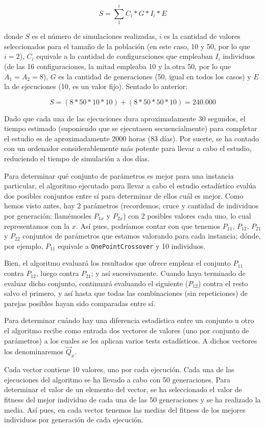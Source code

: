 $$
S = \sum_{1}^{i} C_i * G * I_i * E
$$

donde $S$ es el número de simulaciones realizadas, $i$ es la cantidad de valores seleccionados para el tamaño de la población (en este caso, 10 y 50, por lo que $i=2$), $C_i$ equivale a la cantidad de configuraciones que empleaban $I_i$ individuos (de las 16 configuraciones, la mitad empleaba 10 y la otra 50, por lo que $A_1 = A_2 = 8$), $G$ es la cantidad de generaciones (50, igual en todos los casos) y $E$ la de ejecuciones (10, es un valor fijo). Sentado lo anterior:

$$
S = (8*50*10*10) + (8*50*50*10) = 240.000
$$

Dado que cada una de las ejecuciones dura aproximadamente 30 segundos, el tiempo estimado (suponiendo que se ejecutasen secuencialmente) para completar el estudio es de aproximadamente 2000 horas (83 días). Por suerte, se ha contado con un ordenador considerablemente más potente para llevar a cabo el estudio, reduciendo el tiempo de simulación a dos días.

Para determinar qué conjunto de parámetros es mejor para una instancia particular, el algoritmo ejecutado para llevar a cabo el estudio estadístico evalúa dos posibles conjuntos entre sí para determinar de ellos cuál es mejor. Como hemos visto antes, hay 2 parámetros (recordemos, cruce y cantidad de individuos por generación; llamémosles $P_{1x}$ y $P_{2x}$) con 2 posibles valores cada uno, lo cual representamos con la $x$. Así pues, podríamos contar con que tenemos $P_{11}$, $P_{12}$, $P_{21}$ y $P_{22}$ conjuntos de parámetros que estamos valorando para cada instancia; dónde, por ejemplo, $P_{11}$ equivale a \texttt{OnePointCrossover} y 10 individuos. 

Bien, el algoritmo evaluará los resultados que ofrece emplear el conjunto $P_{11}$ contra $P_{12}$, luego contra $P_{21}$; y así sucesivamente. Cuando haya terminado de evaluar dicho conjunto, continuará evaluando el siguiente ($P_{12}$) contra el resto salvo el primero, y así hasta que todas las combinaciones (sin repeticiones) de parejas posibles hayan sido comparadas entre sí.

Para determinar cuándo hay una diferencia estadística entre un conjunto u otro el algoritmo recibe como entrada dos vectores de valores (uno por conjunto de parámetros) a los cuales se les aplican varios tests estadísticos. A dichos vectores los denominaremos $\vec{Q}_x$.

Cada vector contiene 10 valores, uno por cada ejecución. Cada una de las ejecuciones del algoritmo se ha llevado a cabo con 50 generaciones. Para determinar el valor de un elemento del vector, se ha seleccionado el valor de fitness del mejor individuo de cada una de las 50 generaciones y se ha realizado la media. Así pues, en cada vector tenemos las medias del fitness de los mejores individuos por generación de cada ejecución.

